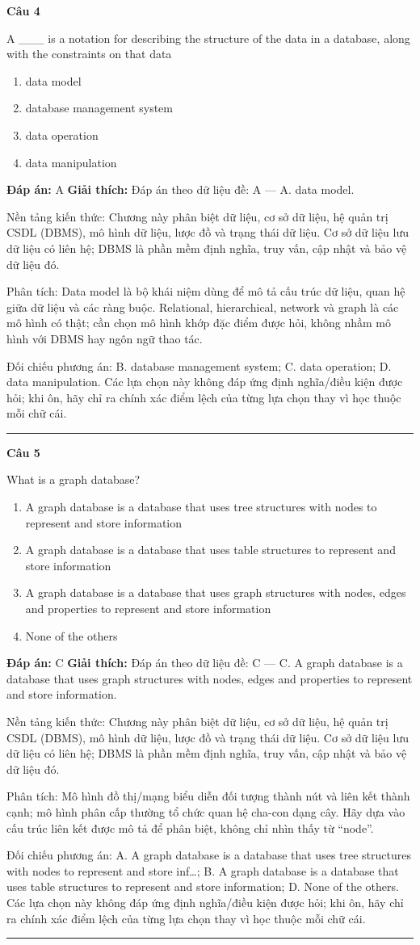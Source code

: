 \documentclass[11pt,a4paper]{article}
\newenvironment{question}[1]{%
  \par\vspace{1em}\noindent\textbf{\large Câu #1}\par\vspace{0.4em}
}{%
  \par\vspace{1em}\hrule\vspace{0.6em}
}
\newenvironment{choices}{%
  \begin{enumerate}[label=\textbf{\Alph*.},leftmargin=2.2em,itemsep=2pt,topsep=3pt]
}{%
  \end{enumerate}
}
\newcommand{\choice}{\item}
\begin{document}
\begin{question}{4}
A ___ is a notation for describing the structure of the data in a database, along with the constraints on that data
\begin{choices}
\choice data model
\choice database management system
\choice data operation
\choice data manipulation
\end{choices}
\textbf{Đáp án:} A
\textbf{Giải thích:} Đáp án theo dữ liệu đề: A — A. data model.

Nền tảng kiến thức: Chương này phân biệt dữ liệu, cơ sở dữ liệu, hệ quản trị CSDL (DBMS), mô hình dữ liệu, lược đồ và trạng thái dữ liệu. Cơ sở dữ liệu lưu dữ liệu có liên hệ; DBMS là phần mềm định nghĩa, truy vấn, cập nhật và bảo vệ dữ liệu đó.

Phân tích: Data model là bộ khái niệm dùng để mô tả cấu trúc dữ liệu, quan hệ giữa dữ liệu và các ràng buộc. Relational, hierarchical, network và graph là các mô hình có thật; cần chọn mô hình khớp đặc điểm được hỏi, không nhầm mô hình với DBMS hay ngôn ngữ thao tác.

Đối chiếu phương án: B. database management system; C. data operation; D. data manipulation. Các lựa chọn này không đáp ứng định nghĩa/điều kiện được hỏi; khi ôn, hãy chỉ ra chính xác điểm lệch của từng lựa chọn thay vì học thuộc mỗi chữ cái.
\end{question}

\begin{question}{5}
What is a graph database?
\begin{choices}
\choice A graph database is a database that uses tree structures with nodes to represent and store information
\choice A graph database is a database that uses table structures to represent and store information
\choice A graph database is a database that uses graph structures with nodes, edges and properties to represent and store information
\choice None of the others
\end{choices}
\textbf{Đáp án:} C
\textbf{Giải thích:} Đáp án theo dữ liệu đề: C — C. A graph database is a database that uses graph structures with nodes, edges and properties to represent and store information.

Nền tảng kiến thức: Chương này phân biệt dữ liệu, cơ sở dữ liệu, hệ quản trị CSDL (DBMS), mô hình dữ liệu, lược đồ và trạng thái dữ liệu. Cơ sở dữ liệu lưu dữ liệu có liên hệ; DBMS là phần mềm định nghĩa, truy vấn, cập nhật và bảo vệ dữ liệu đó.

Phân tích: Mô hình đồ thị/mạng biểu diễn đối tượng thành nút và liên kết thành cạnh; mô hình phân cấp thường tổ chức quan hệ cha-con dạng cây. Hãy dựa vào cấu trúc liên kết được mô tả để phân biệt, không chỉ nhìn thấy từ “node”.

Đối chiếu phương án: A. A graph database is a database that uses tree structures with nodes to represent and store inf…; B. A graph database is a database that uses table structures to represent and store information; D. None of the others. Các lựa chọn này không đáp ứng định nghĩa/điều kiện được hỏi; khi ôn, hãy chỉ ra chính xác điểm lệch của từng lựa chọn thay vì học thuộc mỗi chữ cái.
\end{question}
\end{document}
